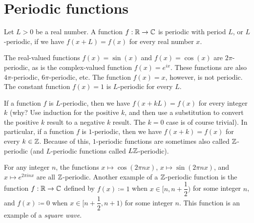 \section{Periodic functions}\label{ii:sec:5.1}

\begin{defn}\label{ii:5.1.1}
  Let \(L > 0\) be a real number.
  A function \(f : \mathbb{R} \to \mathbb{C}\) is periodic with period \(L\), or \(L\)-periodic, if we have \(f(x + L) = f(x)\) for every real number \(x\).
\end{defn}

\begin{eg}\label{ii:5.1.2}
  The real-valued functions \(f(x) = \sin(x)\) and \(f(x) = \cos(x)\) are \(2\pi\)-periodic, as is the complex-valued function \(f(x) = e^{i x}\).
  These functions are also \(4\pi\)-periodic, \(6\pi\)-periodic, etc.
  The function \(f(x) = x\), however, is not periodic.
  The constant function \(f(x) = 1\) is \(L\)-periodic for every \(L\).
\end{eg}

\begin{rmk}\label{ii:5.1.3}
  If a function \(f\) is \(L\)-periodic, then we have \(f(x + kL) = f(x)\) for every integer \(k\)
  (why? Use induction for the positive \(k\), and then use a substitution to convert the positive \(k\) result to a negative \(k\) result.
  The \(k = 0\) case is of course trivial).
  In particular, if a function \(f\) is \(1\)-periodic, then we have \(f(x + k) = f(x)\) for every \(k \in \mathbb{Z}\).
  Because of this, \(1\)-periodic functions are sometimes also called \(\mathbb{Z}\)-periodic
  (and \(L\)-periodic functions called \(L \mathbb{Z}\)-periodic).
\end{rmk}

\begin{eg}\label{ii:5.1.4}
  For any integer \(n\), the functions \(x \mapsto \cos(2 \pi n x)\), \(x \mapsto \sin(2 \pi n x)\), and \(x \mapsto e^{2 \pi i n x}\) are all \(\mathbb{Z}\)-periodic.
  Another example of a \(\mathbb{Z}\)-periodic function is the function \(f : \mathbb{R} \to \mathbb{C}\) defined by \(f(x) \coloneqq 1\) when \(x \in [n, n + \dfrac{1}{2})\) for some integer \(n\), and \(f(x) \coloneqq 0\) when \(x \in [n + \dfrac{1}{2}, n + 1)\) for some integer \(n\).
  This function is an example of a \emph{square wave}.
\end{eg}

